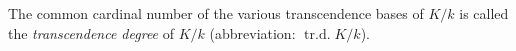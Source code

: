 The common cardinal number of the various transcendence bases of $K/k$ is called the \textit{transcendence degree} of $K/k$ (abbreviation: $\operatorname{tr.d.} K/k$).

